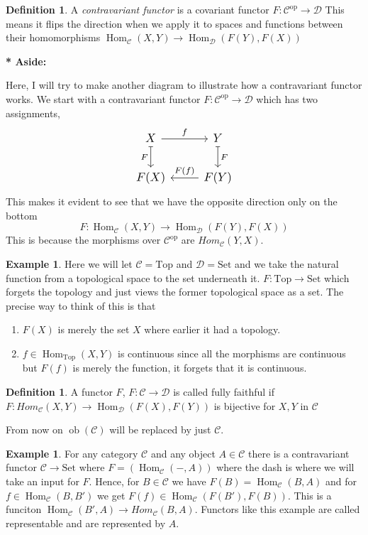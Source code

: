 \documentclass[11pt,a4paper]{article}
\DeclareMathOperator{\Hom}{Hom}
\newcommand{\Cat}{\mathcal{C}}
\newcommand{\CatD}{\mathcal{D}}
\DeclareMathOperator{\ob}{ob}
\newenvironment{asidebar}{%
    \def\FrameCommand{\vrule width 1.5pt \hspace{8pt}}%
    \MakeFramed{\advance\hsize-\width\FrameRestore}%
}{\endMakeFramed}
\newenvironment{aside}{%
    \begin{asidebar}\noindent\textbf{* Aside:}\enspace
}{\end{asidebar}}
\theoremstyle{plain}
\theoremstyle{definition}
\newtheorem{definition}[theorem]{Definition}
\newtheorem{example}[theorem]{Example}
\theoremstyle{remark}
\begin{document}
\begin{definition}
    A \emph{contravariant functor} is a covariant functor $F: \Cat^{\text{op}} \to \CatD$ This means it flips the direction when we apply it to spaces and functions between their homomorphisms $\Hom_\Cat(X,Y) \to \Hom_\CatD(F(Y),F(X))$
\end{definition}

\begin{aside}
Here, I will try to make another diagram to illustrate how a contravariant functor works. We start with a contravariant functor $F: \Cat^\text{op} \to \CatD$ which has two assignments, 
\[
\scalebox{1.2}{
\begin{tikzcd}[ampersand replacement=\&]
X \arrow[r, "f"] \arrow[d, mapsto, "F"'] \&
Y \arrow[d, mapsto, "F"] \\
F(X) \&
F(Y) \arrow[l, "F(f)"']
\end{tikzcd}
}
\]
This makes it evident to see that we have the opposite direction only on the bottom $$F: \Hom_\Cat(X,Y) \to \Hom_\CatD(F(Y),F(X))$$ This is because the morphisms over $\Cat^\text{op}$ are $Hom_\Cat(Y, X)$.
\end{aside}

\begin{example}
    Here we will let $\Cat = \text{Top}$ and $\CatD = \text{Set}$ and we take the natural function from a topological space to the set underneath it. $F: \text{Top} \to \text{Set}$ which forgets the topology and just views the former topological space as a set. The precise way to think of this is that \begin{enumerate}
        \item $F(X)$ is merely the set $X$ where earlier it had a topology.
        \item $f \in \Hom_\text{Top}(X,Y)$ is continuous since all the morphisms are continuous but $F(f)$ is merely the function, it forgets that it is continuous.
    \end{enumerate}
\end{example}

\begin{definition}
    A functor $F$, $F:\Cat \to \CatD$ is called fully faithful if $F: Hom_\Cat(X,Y) \to \Hom_\CatD(F(X),F(Y))$ is bijective for $X,Y$ in $\Cat$
\end{definition}

\noindent
From now on $\ob(\Cat)$ will be replaced by just $\Cat$.

\begin{example}
    For any category $\Cat$ and any object $A \in \Cat$ there is a contravariant functor $\Cat \to \text{Set}$ where $F = (\Hom_\Cat(-,A))$ where the dash is where we will take an input for $F$. Hence, for $B \in \Cat$ we have $F(B) = \Hom_\Cat(B,A)$ and for $f \in \Hom_\Cat(B,B')$ we get $F(f) \in \Hom_\Cat(F(B'),F(B))$. This is a funciton $\Hom_\Cat(B', A) \to Hom_\Cat(B,A)$. Functors like this example are called representable and are represented by $A$.
\end{example}
\end{document}

